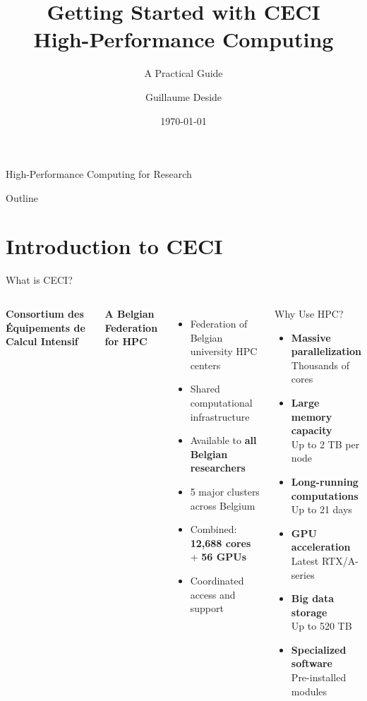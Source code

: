 \documentclass[aspectratio=169]{beamer}
\title[CECI HPC Introduction]{Getting Started with CECI\\High-Performance Computing}
\subtitle{A Practical Guide}
\author{Guillaume Deside}
\date{\today}
\begin{document}
\begin{frame}
  \titlepage
  \begin{center}
    \small
     High-Performance Computing for Research
  \end{center}
\end{frame}

\begin{frame}{Outline}
  \tableofcontents
\end{frame}

\section{Introduction to CECI}

\begin{frame}{What is CECI?}
\begin{columns}[T]
\textbf{Consortium des Équipements de Calcul Intensif}

\vspace{0.8em}
\textcolor{ceciblue}{\textbf{A Belgian Federation for HPC}}

\vspace{0.5em}
\begin{itemize}
    \item Federation of Belgian university HPC centers
    \item Shared computational infrastructure
    \item Available to \textbf{all Belgian researchers}
    \item 5 major clusters across Belgium
    \item Combined: \textbf{12,688 cores} + \textbf{56 GPUs}
    \item Coordinated access and support
\end{itemize}

\begin{block}{Why Use HPC?}
\begin{itemize}
    \item \textbf{Massive parallelization}\\
    {\small Thousands of cores}
    \item \textbf{Large memory capacity}\\
    {\small Up to 2 TB per node}
    \item \textbf{Long-running computations}\\
    {\small Up to 21 days}
    \item \textbf{GPU acceleration}\\
    {\small Latest RTX/A-series}
    \item \textbf{Big data storage}\\
    {\small Up to 520 TB}
    \item \textbf{Specialized software}\\
    {\small Pre-installed modules}
\end{itemize}
\end{block}
\end{columns}
\end{frame}
\end{document}
